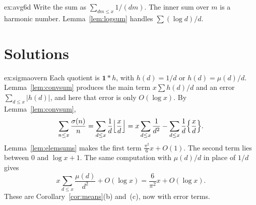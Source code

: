 \begin{hint}{ex:avg6d}
Write the sum as $\sum_{dm\le x}1/(dm)$. The inner sum over $m$ is a harmonic number. Lemma~\ref{lem:logsum} handles $\sum(\log d)/d$.
\end{hint}

\section{Solutions}

\begin{solution}{ex:sigmaovern}
\idea Each quotient is $\mathbf1*h$, with $h(d)=1/d$ or $h(d)=\mu(d)/d$. Lemma~\ref{lem:convsum} produces the main term $x\sum h(d)/d$ and an error $\sum_{d\le x}|h(d)|$, and here that error is only $O(\log x)$.
\writeup By Lemma~\ref{lem:convsum},
\[
\sum_{n\le x}\frac{\sigma(n)}n=\sum_{d\le x}\frac1d\Bigl\lfloor\frac xd\Bigr\rfloor=x\sum_{d\le x}\frac1{d^2}-\sum_{d\le x}\frac1d\Bigl\{\frac xd\Bigr\}.
\]
Lemma~\ref{lem:elemsums} makes the first term $\frac{\pi^2}6 x+O(1)$. The second term lies between $0$ and $\log x+1$. The same computation with $\mu(d)/d$ in place of $1/d$ gives
\[
x\sum_{d\le x}\frac{\mu(d)}{d^2}+O(\log x)=\frac6{\pi^2}x+O(\log x).
\]
These are Corollary~\ref{cor:means}(b) and~(c), now with error terms.
\end{solution}

